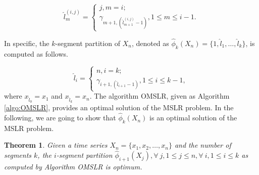 \documentclass{article}
\newtheorem{theorem}{Theorem}
\begin{document}
\[ \hat l_m^{(i,j)} = \left\{ \begin{array}{ll}
  j, \mbox{$m=i$};\\
  \gamma_{m+1,(\hat l_{m+1}^{(i,j)}-1)}, \mbox{$1 \leq m \leq i-1$}.
\end{array} \right.
\]

In specific, the $k$-segment partition of $X_n$, denoted as $ \hat \phi_k(X_n) = \{1, \hat l_1, \dots, \hat l_k \}$, is computed as follows.

\[ \hat l_i = \left\{ \begin{array}{ll}
  n, \mbox{$i = k$};\\
  \gamma_{i+1,( \hat l_{i+1}-1)}, \mbox{$1 \leq i \leq k-1$},
\end{array} \right.
\]
where $ x_{\hat l_0} = x_1$ and $x_{\hat l_k} = x_n$.
The algorithm OMSLR, given as Algorithm \ref{algo:OMSLR}, provides an optimal solution of the MSLR problem. In the following, we are going to show that $\hat \phi_k(X_n)$ is an optimal solution of the MSLR problem.



\begin{theorem}\label{theorem:1}
  Given a time series $X_n = \{x_1, x_2,\dots,x_n\}$ and the number of segments $k$, the $i$-segment partition $\hat \phi_{i+1}(X_j), \forall~j, 1 \leq j \leq n, \forall~i, 1 \leq i \leq k$ as computed by Algorithm OMSLR is optimum.
\end{theorem}
\end{document}
